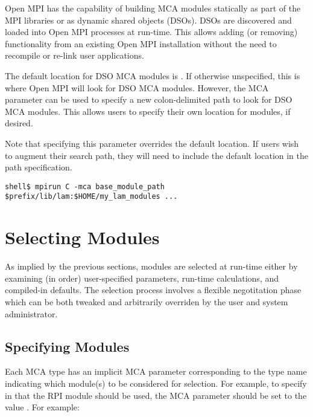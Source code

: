 
Open MPI has the capability of building MCA modules statically as part of
the MPI libraries or as dynamic shared objects (DSOs).  DSOs are
discovered and loaded into Open MPI processes at run-time.  This allows
adding (or removing) functionality from an existing Open MPI installation
without the need to recompile or re-link user applications.

The default location for DSO MCA modules is .
If otherwise unspecified, this is where Open MPI will look for DSO MCA
modules.  However, the MCA parameter
 can be used to specify a new
colon-delimited path to look for DSO MCA modules.  This allows users
to specify their own location for modules, if desired.

Note that specifying this parameter overrides the default location.
If users wish to augment their search path, they will need to include
the default location in the path specification.

\lstset{style=lam-cmdline}
\begin{lstlisting}
shell$ mpirun C -mca base_module_path $prefix/lib/lam:$HOME/my_lam_modules ...
\end{lstlisting}



\section{Selecting Modules}

As implied by the previous sections, modules are selected at run-time
either by examining (in order) user-specified parameters, run-time
calculations, and compiled-in defaults.  The selection process
involves a flexible negotitation phase which can be both tweaked and
arbitrarily overriden by the user and system administrator.


\subsection{Specifying Modules}

Each MCA type has an implicit MCA parameter corresponding to the type
name indicating which module(s) to be considered for selection.  For
example, to specify in that the  RPI module should be used,
the MCA parameter  should be set to the value
.  For example:

